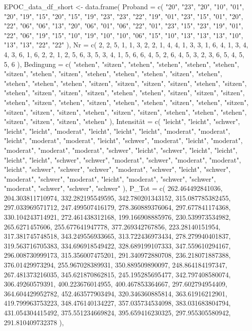 \documentclass[
  letterpaper,
  DIV=11]{scrartcl}
\newenvironment{Shaded}{\begin{snugshade}}{\end{snugshade}}
\newcommand{\NormalTok}[1]{\textcolor[rgb]{0.00,0.23,0.31}{#1}}
\begin{document}
\begin{Shaded}
\begin{Highlighting}[]
\NormalTok{EPOC\_data\_df\_short \textless{}{-} data.frame(}
\NormalTok{  \textasciigrave{}Proband\textasciigrave{} = c( "20", "23", "20", "10", "01", "20", "19", "15", "20", "15", "19", "23", "23", "22", "19", "01", "23", "15", "01", "20", "22", "06", "06", "13", "20", "06", "01", "06", "22", "01", "23", "15", "23", "19", "01", "22", "06", "19", "15", "10", "19", "10", "10", "06", "15", "10", "13", "13", "13", "10", "13", "13", "22", "22" ),}
\NormalTok{  \textasciigrave{}Nr\textasciigrave{} = c( 2, 2, 5, 1, 1, 3, 2, 2, 1, 4, 4, 1, 3, 3, 1, 6, 4, 1, 3, 4, 4, 3, 6, 1, 6, 2, 2, 1, 2, 5, 6, 3, 5, 3, 4, 1, 5, 6, 6, 4, 5, 2, 6, 4, 5, 3, 2, 3, 6, 5, 4, 5, 5, 6 ),}
\NormalTok{  \textasciigrave{}Bedingung\textasciigrave{} = c( "stehen", "sitzen", "stehen", "stehen", "stehen", "stehen", "sitzen", "stehen", "sitzen", "stehen", "stehen", "stehen", "sitzen", "stehen", "stehen", "stehen", "stehen", "sitzen", "sitzen", "sitzen", "sitzen", "stehen", "sitzen", "stehen", "sitzen", "sitzen", "sitzen", "stehen", "stehen", "sitzen", "sitzen", "sitzen", "stehen", "sitzen", "stehen", "sitzen", "stehen", "stehen", "sitzen", "stehen", "sitzen", "sitzen", "sitzen", "sitzen", "stehen", "sitzen", "sitzen", "stehen", "stehen", "stehen", "sitzen", "sitzen", "sitzen", "stehen" ),}
\NormalTok{  \textasciigrave{}Intensität\textasciigrave{} = c( "leicht", "leicht", "schwer", "leicht", "leicht", "moderat", "leicht", "leicht", "leicht", "moderat", "moderat", "leicht", "moderat", "moderat", "leicht", "schwer", "moderat", "leicht", "moderat", "moderat", "moderat", "moderat", "schwer", "leicht", "schwer", "leicht", "leicht", "leicht", "leicht", "schwer", "schwer", "moderat", "schwer", "moderat", "moderat", "leicht", "schwer", "schwer", "schwer", "moderat", "schwer", "leicht", "schwer", "moderat", "schwer", "moderat", "leicht", "moderat", "schwer", "schwer", "moderat", "schwer", "schwer", "schwer" ),}
\NormalTok{  \textasciigrave{}P\_Tot\textasciigrave{} = c( 262.464492841036, 204.303811710974, 332.282195549595, 342.780201343152, 315.087785382455, 297.033969571712, 247.499507416179, 278.360889376064, 297.677841174368, 330.104243714921, 272.461438312168, 199.166908885976, 230.539973534982, 265.6271457606, 255.677641947778, 377.269342767856, 223.28140151954, 317.381745748518, 343.249556933665, 313.722436973434, 278.279940401837, 319.563716705383, 334.696918549422, 328.689199107333, 347.559610294167, 296.008730999173, 315.356007475201, 291.340972880708, 236.218071887388, 376.01429973294, 255.967028389931, 350.889509890097, 248.864184197347, 267.481373216035, 345.621870862815, 245.195285695477, 342.797408580074, 306.49260579391, 400.223676014955, 400.467853364667, 297.602794954409, 364.604429952782, 452.463577903494, 320.346360885814, 363.61916212901, 419.799963753223, 348.476140134227, 357.035734534098, 383.031683804794, 431.054304415492, 375.551234669824, 395.659416230325, 297.955305580942, 291.810409732378 ),}

\end{Highlighting}
\end{Shaded}
\end{document}
